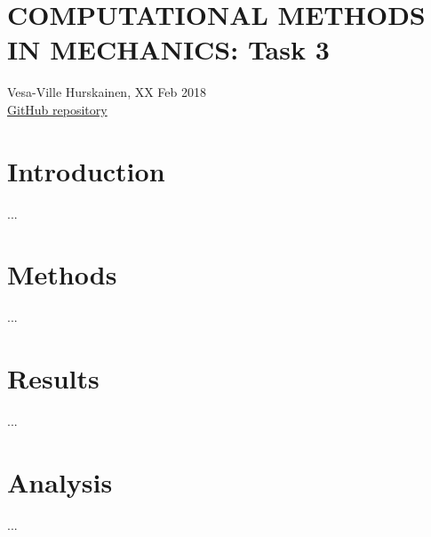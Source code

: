 \documentclass{article}
\begin{document}
	\section*{COMPUTATIONAL METHODS IN MECHANICS: Task 3}
	Vesa-Ville Hurskainen, XX Feb 2018\\
	\href{https://github.com/VesaVilleHurskainen/cmim2018}{GitHub repository}

	\section*{Introduction}
	...

	\section*{Methods}
	...

	\section*{Results}
	...

	\section*{Analysis}
	...
\end{document}
